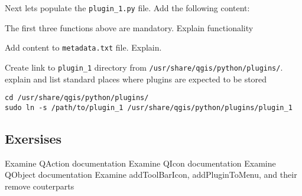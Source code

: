 \par%
Next lets populate the \lstinline{plugin_1.py} file. Add the following content:

The first three functions above are mandatory. Explain functionality
\par%
Add content to \lstinline{metadata.txt} file. Explain.
\par%
Create link to \lstinline{plugin_1} directory from \lstinline{/usr/share/qgis/python/plugins/}. explain and list standard places where plugins are expected to be stored
\begin{lstlisting}
cd /usr/share/qgis/python/plugins/
sudo ln -s /path/to/plugin_1 /usr/share/qgis/python/plugins/plugin_1
\end{lstlisting}

\subsection{Exersises}
Examine QAction documentation
Examine QIcon documentation
Examine QObject documentation
Examine addToolBarIcon, addPluginToMenu, and their remove couterparts
